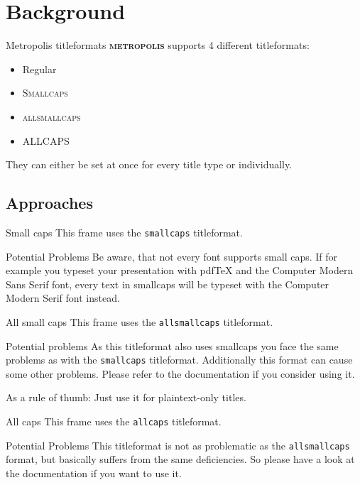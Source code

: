 \documentclass[10pt]{beamer}
\newcommand{\themename}{\textbf{\textsc{metropolis}}\xspace}
\begin{document}
\section{Background}

\begin{frame}{Metropolis titleformats}
	\themename supports 4 different titleformats:
	\begin{itemize}
		\item Regular
		\item \textsc{Smallcaps}
		\item \textsc{allsmallcaps}
		\item ALLCAPS
	\end{itemize}
	They can either be set at once for every title type or individually.
\end{frame}

\subsection{Approaches}

{
\begin{frame}{Small caps}
	This frame uses the \texttt{smallcaps} titleformat.

	\begin{alertblock}{Potential Problems}
		Be aware, that not every font supports small caps. If for example you typeset your presentation with pdfTeX and the Computer Modern Sans Serif font, every text in smallcaps will be typeset with the Computer Modern Serif font instead.
	\end{alertblock}
\end{frame}
}

{
\begin{frame}{All small caps}
	This frame uses the \texttt{allsmallcaps} titleformat.

	\begin{alertblock}{Potential problems}
		As this titleformat also uses smallcaps you face the same problems as with the \texttt{smallcaps} titleformat. Additionally this format can cause some other problems. Please refer to the documentation if you consider using it.

		As a rule of thumb: Just use it for plaintext-only titles.
	\end{alertblock}
\end{frame}
}

{
\begin{frame}{All caps}
	This frame uses the \texttt{allcaps} titleformat.

	\begin{alertblock}{Potential Problems}
		This titleformat is not as problematic as the \texttt{allsmallcaps} format, but basically suffers from the same deficiencies. So please have a look at the documentation if you want to use it.
	\end{alertblock}
\end{frame}
}
\end{document}
